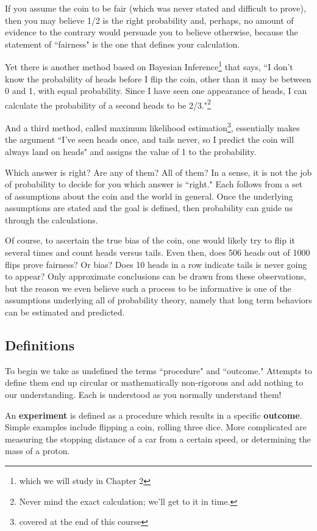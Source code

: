 \documentclass[../main.tex]{subfiles}
\begin{document}
If you assume the coin to be fair (which was never stated and
difficult to prove), then you may believe 1/2 is the right
probability and, perhaps, no amount of evidence to the contrary would
persuade you to believe otherwise, because the statement of ``fairness"
is the one that defines your calculation.

Yet there is another method based on Bayesian Inference\footnote{which
we will study in Chapter 2} that says, ``I don't know the probability 
of heads before I flip the coin, other than it may be between 0 and 1, 
with equal probability. Since I have seen one appearance of heads,
I can calculate the probability of a second heads to be 2/3."\footnote{Never
	mind the exact calculation; we'll get to it in time.}

And a third method, called maximum likelihood estimation\footnote{covered at the end of this course}, essentially
makes the argument ``I've seen heads once, and tails never, so I
predict the coin will always land on heads" and assigns the value of
1 to the probability.

Which answer is right? Are any of them? All of them? In a sense, it
is not the job of probability to decide for you which answer is ``right." Each follows from a set of assumptions about the coin and
the world in general. Once the underlying assumptions are stated
and the goal is defined, then probability can guide us through the
calculations. 

Of course, to ascertain the true bias of the coin, one would likely try to flip it several times and count heads versus tails. Even then,
does 506 heads out of 1000 flips prove fairness? Or bias? Does 10 heads in a row indicate tails is never going to appear? Only approximate
conclusions can be drawn from these observations, but the reason we
even believe such a process to be informative is one of the assumptions underlying all of probability theory, namely that long term behaviors can
be estimated and predicted.

\subsection{Definitions}
To begin we take as undefined the terms ``procedure"
and ``outcome." Attempts to define them end up circular or
mathematically non-rigorous and add nothing to our understanding. Each
is understood as you normally understand them!

An \textbf{experiment} is defined as a procedure which results in
a specific \textbf{outcome}. Simple examples include flipping a coin, rolling three dice. More complicated are measuring the stopping distance
of a car from a certain speed, or determining the mass of a proton.
\end{document}
